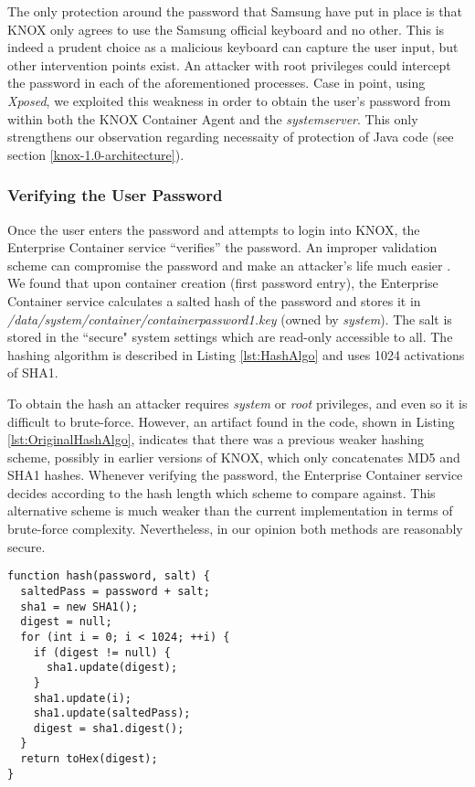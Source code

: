 \documentclass[11pt]{article}
\begin{document}
The only protection around the password that Samsung have put in place is that KNOX only agrees to use the Samsung official keyboard and no other.
This is indeed a prudent choice as a malicious keyboard can capture the user input, but other intervention points exist.
An attacker with root privileges could intercept the password in each of the aforementioned processes. 
Case in point, using \emph{Xposed}, we exploited this weakness in order to obtain the user's password from within both the KNOX Container Agent
and the \emph{system\textunderscore server}. This only strengthens our observation regarding necessaity of protection of Java code 
(see section \ref{knox-1.0-architecture}).

\subsubsection{Verifying the User Password}
Once the user enters the password and attempts to login into KNOX, the Enterprise Container service ``verifies'' the password.
An improper validation scheme can compromise the password and make an attacker's life much easier \cite{DoYouThinkYourPasswordsAreSecure}.
We found that upon container creation (first password entry), the Enterprise Container service calculates a salted hash of the password and stores it in 
\emph{/data/system/container/containerpassword\textunderscore 1.key} (owned by \emph{system}). The salt is stored in the ``secure" system
settings which are read-only accessible to all. The hashing algorithm is described in Listing \ref{lst:HashAlgo} and uses 1024 activations of SHA1.

To obtain the hash an attacker requires \emph{system} or \emph{root} privileges, and even so it is difficult to brute-force.
However, an artifact found in the code, shown in Listing \ref{lst:OriginalHashAlgo}, 
indicates that there was a previous weaker hashing scheme, possibly in earlier versions of KNOX, which only concatenates MD5 and SHA1 hashes. 
Whenever verifying the password, the Enterprise Container service decides according to the hash length which scheme to compare against.
This alternative scheme is much weaker than the current implementation in terms of brute-force complexity. 
Nevertheless, in our opinion both methods are reasonably secure.

\begin{lstlisting}[caption={Current Hash Algorithm}, label={lst:HashAlgo}]
function hash(password, salt) {
  saltedPass = password + salt;
  sha1 = new SHA1();
  digest = null;
  for (int i = 0; i < 1024; ++i) {
    if (digest != null) {
      sha1.update(digest);
    }
    sha1.update(i);
    sha1.update(saltedPass);
    digest = sha1.digest();
  }
  return toHex(digest);
}
\end{lstlisting}
\end{document}
